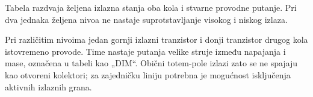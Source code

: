 Tabela razdvaja željena izlazna stanja oba kola i stvarne provodne putanje. Pri dva jednaka željena nivoa ne nastaje suprotstavljanje visokog i niskog izlaza.

Pri različitim nivoima jedan gornji izlazni tranzistor i donji tranzistor drugog kola istovremeno provode. Time nastaje putanja velike struje između napajanja i mase, označena u tabeli kao „DIM“. Obični totem-pole izlazi zato se ne spajaju kao otvoreni kolektori; za zajedničku liniju potrebna je mogućnost isključenja aktivnih izlaznih grana.
